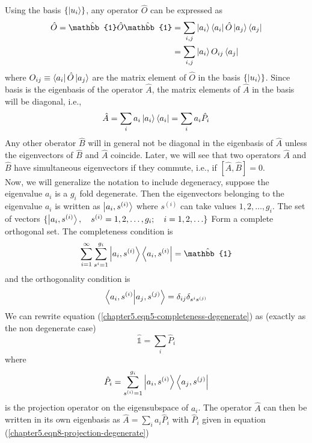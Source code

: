 	Using the basis $\{\ket{u_i}\}$, any operator $\hat{O}$ can be expressed as 
	\begin{eqnarray}
		\hat{O} = \hat{\mathbb{1}} \hat{O} \hat{\mathbb{1}} 
		&= \sum_{i,j} \ket{a_i}\bra{a_i} \hat{O} \ket{a_j}\bra{a_j} \nonumber \\
		&= \sum_{i,j} \ket{a_i} O_{ij} \bra{a_j}
		\label{chapter5.eqn3-operator-as-matrix}
	\end{eqnarray}
	where $O_{ij} \equiv \bra{a_i} \hat{O} \ket{a_j}$ are the matrix element of  $\hat{O}$ in the basis $\{\ket{u_i}\}$. Since basis is the eigenbasis of the operator $\hat{A}$, the matrix elements of $\hat{A}$ in the basis will be diagonal, i.e., 
	\begin{equation}
		\hat{A} = \sum_i a_i \ket{a_i}\bra{a_i} = \sum_i a_i \hat{P}_i
		\label{chapter5.eqn4-diagonalized-operator-projection}
	\end{equation}
	Any other oberator $\hat{B}$ will in general not be diagonal in the eigenbasis of $\hat{A}$ unless the eigenvectors of $\hat{B}$ and $\hat{A}$ coincide. Later, we will see that two operators $\hat{A}$ and $\hat{B}$ have simultaneous eigenvectors if they commute, i.e., if $[\hat{A},\hat{B}]=0$.\\
	
	Now, we will generalize the notation to include degeneracy, suppose the eigenvalue $a_i$ is a $g_i$ fold degenerate. Then the eigenvectors belonging to the eigenvalue $a_i$ is written as $\ket{a_i, s^{(i)}}$ where $s^{(i)}$ can take values $1,2,\ldots, g_i$. The set of vectors $\{\ket{a_i, s^{(i)}}, \quad s^{(i)}=1,2,\ldots,g_i;\quad i=1,2,\ldots\}$ Form a complete orthogonal set. The completeness condition is
	\begin{equation}
		\sum_{i=1}^{\infty} \sum_{s^{i}=1}^{g_i} \ket{a_i, s^{(i)}}\bra{a_i, s^{(i)}} = \hat{\mathbb{1}}
		\label{chapter5.eqn5-completeness-degenerate}
	\end{equation}
	and the orthogonality condition is
	\begin{equation}
		\braket{a_i, s^{(i)}}{a_j, s^{(j)}} = \delta_{ij}\delta_{s^{i}s^{(j)}}
		\label{chapter5.eqn6-orthogonality-degenerate}
	\end{equation}
	We can rewrite equation (\ref{chapter5.eqn5-completeness-degenerate}) as (exactly as the non degenerate case)
	\begin{equation}
		\hat{\mathbb{1}} = \sum_i \hat{P}_i
		\label{chapter5.eqn7-completeness-degenerate-rewrite}
	\end{equation}
	where
	\begin{equation}
		\hat{P}_i = \sum_{s^{(i)}=1}^{g_i} \ket{a_i, s^{(i)}}\bra{a_j, s^{(j)}}
		\label{chapter5.eqn8-projection-degenerate}
	\end{equation}
	is the projection operator on the eigensubspace of $a_i$. The operator $\hat{A}$ can then be written in its own eigenbasis as 
	$\hat{A} = \sum_i a_i \hat{P}_i$ with $\hat{P}_i$ given in equation (\ref{chapter5.eqn8-projection-degenerate})
	
